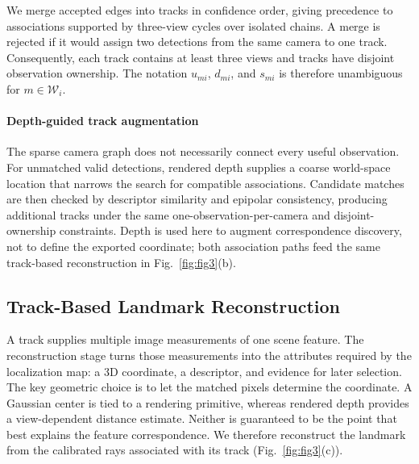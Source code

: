 We merge accepted edges into tracks in confidence order, giving precedence to associations supported by three-view cycles over isolated chains. A merge is rejected if it would assign two detections from the same camera to one track. Consequently, each track contains at least three views and tracks have disjoint observation ownership. The notation $u_{mi}$, $d_{mi}$, and $s_{mi}$ is therefore unambiguous for $m\in\mathcal W_i$.

\paragraph{Depth-guided track augmentation}
The sparse camera graph does not necessarily connect every useful observation. For unmatched valid detections, rendered depth supplies a coarse world-space location that narrows the search for compatible associations. Candidate matches are then checked by descriptor similarity and epipolar consistency, producing additional tracks under the same one-observation-per-camera and disjoint-ownership constraints. Depth is used here to augment correspondence discovery, not to define the exported coordinate; both association paths feed the same track-based reconstruction in Fig.~\ref{fig:fig3}(b).

\subsection{Track-Based Landmark Reconstruction}
\label{sec:geometry}

A track supplies multiple image measurements of one scene feature. The reconstruction stage turns those measurements into the attributes required by the localization map: a 3D coordinate, a descriptor, and evidence for later selection. The key geometric choice is to let the matched pixels determine the coordinate. A Gaussian center is tied to a rendering primitive, whereas rendered depth provides a view-dependent distance estimate. Neither is guaranteed to be the point that best explains the feature correspondence. We therefore reconstruct the landmark from the calibrated rays associated with its track (Fig.~\ref{fig:fig3}(c)).

